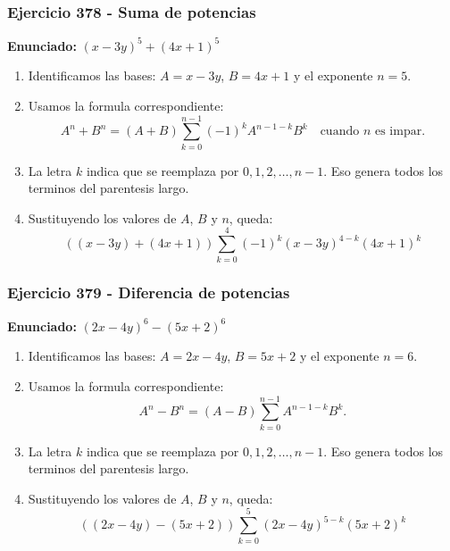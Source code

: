 \documentclass[11pt,a4paper]{article}
\begin{document}
\subsubsection*{Ejercicio 378 - Suma de potencias}
\textbf{Enunciado:} $ \left(x - 3 y\right)^{5}+\left(4 x + 1\right)^{5} $\par
\begin{enumerate}[leftmargin=2em]
\item Identificamos las bases: \(A=x - 3 y\), \(B=4 x + 1\) y el exponente \(n=5\).
\item Usamos la formula correspondiente: \[A^n+B^n=(A+B)\sum_{k=0}^{n-1}(-1)^kA^{n-1-k}B^k\quad\text{cuando }n\text{ es impar}.\]
\item La letra \(k\) indica que se reemplaza por \(0,1,2,\ldots,n-1\). Eso genera todos los terminos del parentesis largo.
\item Sustituyendo los valores de \(A\), \(B\) y \(n\), queda: \[\boxed{\left(\left(x - 3 y\right)+\left(4 x + 1\right)\right)\sum_{k=0}^{4}(-1)^k\left(x - 3 y\right)^{4-k}\left(4 x + 1\right)^k}\]
\end{enumerate}

\vspace{0.2cm}
\subsubsection*{Ejercicio 379 - Diferencia de potencias}
\textbf{Enunciado:} $ \left(2 x - 4 y\right)^{6}-\left(5 x + 2\right)^{6} $\par
\begin{enumerate}[leftmargin=2em]
\item Identificamos las bases: \(A=2 x - 4 y\), \(B=5 x + 2\) y el exponente \(n=6\).
\item Usamos la formula correspondiente: \[A^n-B^n=(A-B)\sum_{k=0}^{n-1}A^{n-1-k}B^k.\]
\item La letra \(k\) indica que se reemplaza por \(0,1,2,\ldots,n-1\). Eso genera todos los terminos del parentesis largo.
\item Sustituyendo los valores de \(A\), \(B\) y \(n\), queda: \[\boxed{\left(\left(2 x - 4 y\right)-\left(5 x + 2\right)\right)\sum_{k=0}^{5}\left(2 x - 4 y\right)^{5-k}\left(5 x + 2\right)^k}\]
\end{enumerate}

\vspace{0.2cm}
\end{document}
